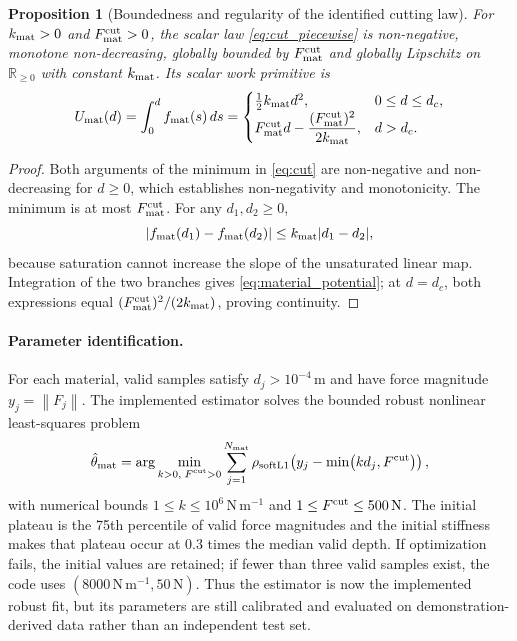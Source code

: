 \documentclass[11pt,a4paper]{article}
\newtheorem{proposition}{Proposition}
\newcommand{\R}{\mathbb{R}}
\newcommand{\norm}[1]{\left\lVert#1\right\rVert}
\begin{document}
\begin{proposition}[Boundedness and regularity of the identified cutting law]
\label{prop:cut_properties}
For $k_{\rm mat}>0$ and $F_{\rm mat}^{\rm cut}>0$, the scalar law
\eqref{eq:cut_piecewise} is non-negative, monotone non-decreasing, globally
bounded by $F_{\rm mat}^{\rm cut}$ and globally Lipschitz on
$\R_{\ge0}$ with constant $k_{\rm mat}$. Its scalar work primitive is
\begin{equation}
U_{\rm mat}(d)=\int_0^d f_{\rm mat}(s)\,ds
=
\begin{cases}
\tfrac12k_{\rm mat}d^2, & 0\le d\le d_c,\\
F_{\rm mat}^{\rm cut}d
-\dfrac{(F_{\rm mat}^{\rm cut})^2}{2k_{\rm mat}}, & d>d_c.
\end{cases}
\label{eq:material_potential}
\end{equation}
\end{proposition}
\begin{proof}
Both arguments of the minimum in \eqref{eq:cut} are non-negative and
non-decreasing for $d\ge0$, which establishes non-negativity and monotonicity.
The minimum is at most $F_{\rm mat}^{\rm cut}$. For any $d_1,d_2\ge0$,
\begin{equation}
\left|f_{\rm mat}(d_1)-f_{\rm mat}(d_2)\right|
\le k_{\rm mat}|d_1-d_2|,
\label{eq:cut_lipschitz}
\end{equation}
because saturation cannot increase the slope of the unsaturated linear map.
Integration of the two branches gives \eqref{eq:material_potential}; at
$d=d_c$, both expressions equal
$(F_{\rm mat}^{\rm cut})^2/(2k_{\rm mat})$, proving continuity.
\end{proof}

\paragraph{Parameter identification.}
For each material, valid samples satisfy $d_j>10^{-4}\,\mathrm m$ and have
force magnitude $y_j=\norm{F_j}$. The implemented estimator solves the bounded
robust nonlinear least-squares problem
\begin{equation}
\hat\theta_{\rm mat}
=\arg\min_{\substack{k>0,\;F^{{\rm cut}}>0}}
\sum_{j=1}^{N_{\rm mat}}
\rho_{\rm softL1}\!\left(
y_j-\min\!\big(kd_j,F^{{\rm cut}}\big)\right),
\label{eq:material_identification}
\end{equation}
with numerical bounds
$1\le k\le10^6\,\mathrm{N\,m^{-1}}$ and
$1\le F^{\rm cut}\le500\,\mathrm N$. The initial plateau is the 75th
percentile of valid force magnitudes and the initial stiffness makes that
plateau occur at $0.3$ times the median valid depth. If optimization fails, the
initial values are retained; if fewer than three valid samples exist, the code
uses $(8000\,\mathrm{N\,m^{-1}},50\,\mathrm N)$. Thus the estimator is now the
implemented robust fit, but its parameters are still calibrated and evaluated
on demonstration-derived data rather than an independent test set.
\end{document}
